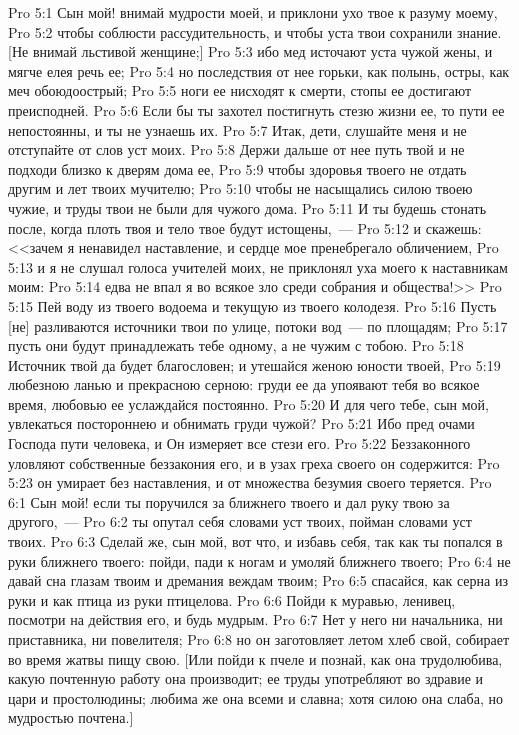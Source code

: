 \vs Pro 5:1 Сын мой! внимай мудрости моей, и приклони ухо твое к разуму моему,
\vs Pro 5:2 чтобы соблюсти рассудительность, и чтобы уста твои сохранили знание. [Не внимай льстивой женщине;]
\vs Pro 5:3 ибо мед источают уста чужой жены, и мягче елея речь ее;
\vs Pro 5:4 но последствия от нее горьки, как полынь, остры, как меч обоюдоострый;
\vs Pro 5:5 ноги ее нисходят к смерти, стопы ее достигают преисподней.
\vs Pro 5:6 Если бы ты захотел постигнуть стезю жизни ее, то пути ее непостоянны, и ты не узнаешь их.
\vs Pro 5:7 Итак, дети, слушайте меня и не отступайте от слов уст моих.
\vs Pro 5:8 Держи дальше от нее путь твой и не подходи близко к дверям дома ее,
\vs Pro 5:9 чтобы здоровья твоего не отдать другим и лет твоих мучителю;
\vs Pro 5:10 чтобы не насыщались силою твоею чужие, и труды твои не были для чужого дома.
\vs Pro 5:11 И ты будешь стонать после, когда плоть твоя и тело твое будут истощены,~---
\vs Pro 5:12 и скажешь: <<зачем я ненавидел наставление, и сердце мое пренебрегало обличением,
\vs Pro 5:13 и я не слушал голоса учителей моих, не приклонял уха моего к наставникам моим:
\vs Pro 5:14 едва не впал я во всякое зло среди собрания и общества!>>
\rsbpar\vs Pro 5:15 Пей воду из твоего водоема и текущую из твоего колодезя.
\vs Pro 5:16 Пусть [не] разливаются источники твои по улице, потоки вод~--- по площадям;
\vs Pro 5:17 пусть они будут принадлежать тебе одному, а не чужим с тобою.
\vs Pro 5:18 Источник твой да будет благословен; и утешайся женою юности твоей,
\vs Pro 5:19 любезною ланью и прекрасною серною: груди ее да упоявают тебя во всякое время, любовью ее услаждайся постоянно.
\vs Pro 5:20 И для чего тебе, сын мой, увлекаться постороннею и обнимать груди чужой?
\vs Pro 5:21 Ибо пред очами Господа пути человека, и Он измеряет все стези его.
\vs Pro 5:22 Беззаконного уловляют собственные беззакония его, и в узах греха своего он содержится:
\vs Pro 5:23 он умирает без наставления, и от множества безумия своего теряется.
\vs Pro 6:1 Сын мой! если ты поручился за ближнего твоего и дал руку твою за другого,~---
\vs Pro 6:2 ты опутал себя словами уст твоих, пойман словами уст твоих.
\vs Pro 6:3 Сделай же, сын мой, вот что, и избавь себя, так как ты попался в руки ближнего твоего: пойди, пади к ногам и умоляй ближнего твоего;
\vs Pro 6:4 не давай сна глазам твоим и дремания веждам твоим;
\vs Pro 6:5 спасайся, как серна из руки и как птица из руки птицелова.
\rsbpar\vs Pro 6:6 Пойди к муравью, ленивец, посмотри на действия его, и будь мудрым.
\vs Pro 6:7 Нет у него ни начальника, ни приставника, ни повелителя;
\vs Pro 6:8 но он заготовляет летом хлеб свой, собирает во время жатвы пищу свою. [Или пойди к пчеле и познай, как она трудолюбива, какую почтенную работу она производит; ее труды употребляют во здравие и цари и простолюдины; любима же она всеми и славна; хотя силою она слаба, но мудростью почтена.]
